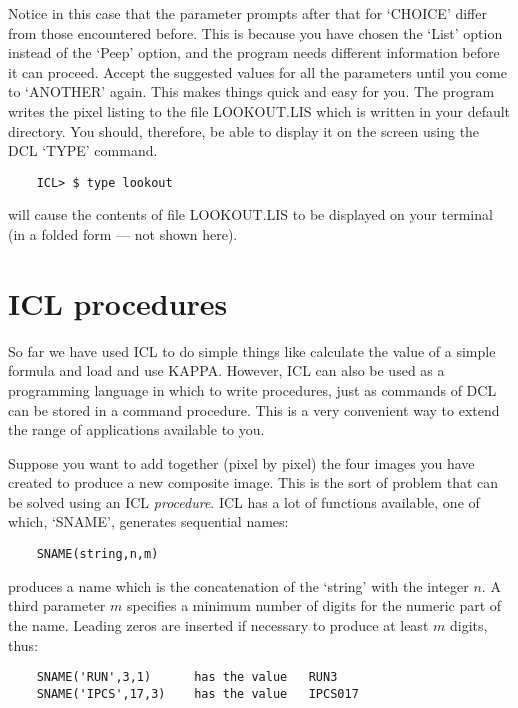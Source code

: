 Notice in this case that the parameter prompts after that for `CHOICE' differ
from those encountered before.
This is because you have chosen the `List' option instead of the `Peep' option,
and the program needs different information before it can proceed.
Accept the suggested values for all the parameters until you come to `ANOTHER'
again.
This makes things quick and easy for you.
The program writes the pixel listing to the file LOOKOUT.LIS which is written
in your default directory.
You should, therefore, be able to display it on the screen using the DCL `TYPE'
command.

\begin{small}
\begin{verbatim}
    ICL> $ type lookout
\end{verbatim}
\end{small}

will cause the contents of file LOOKOUT.LIS to be displayed on your terminal
(in a folded form --- not shown here).

\section{ICL procedures}
\label{S_iclprocs}

So far we have used ICL to do simple things like calculate the value of a simple
formula and load and use KAPPA.
However, ICL can also be used as a programming language in which to write
procedures, just as commands of DCL can be stored in a command procedure.
This is a very convenient way to extend the range of applications available to
you.

Suppose you want to add together (pixel by pixel) the four images you have
created to produce a new composite image.
This is the sort of problem that can be solved using an ICL {\em procedure}.
ICL has a lot of functions available, one of which, `SNAME', generates
sequential names:

\begin{small}
\begin{verbatim}
    SNAME(string,n,m)
\end{verbatim}
\end{small}

produces a name which is the concatenation of the `string' with the 
integer $n$.
A third parameter $m$ specifies a minimum number of digits for the
numeric part of the name. Leading zeros are inserted if necessary to produce at
least $m$ digits, thus:

\begin{small}
\begin{verbatim}
    SNAME('RUN',3,1)      has the value   RUN3
    SNAME('IPCS',17,3)    has the value   IPCS017
\end{verbatim}
\end{small}

